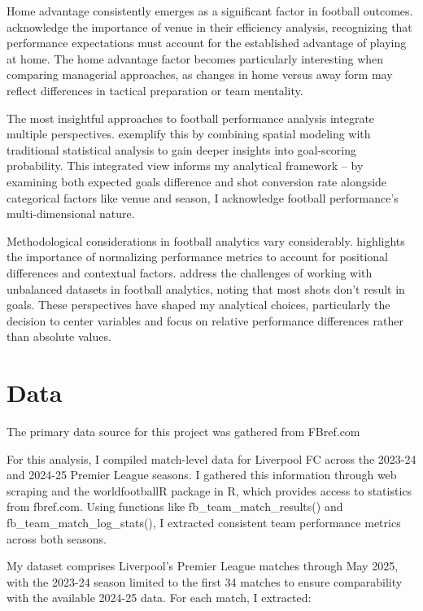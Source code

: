 \documentclass[12pt]{article}
\begin{document}
Home advantage consistently emerges as a significant factor in football outcomes. \citet{kern2012} acknowledge the importance of venue in their efficiency analysis, recognizing that performance expectations must account for the established advantage of playing at home. The home advantage factor becomes particularly interesting when comparing managerial approaches, as changes in home versus away form may reflect differences in tactical preparation or team mentality.

The most insightful approaches to football performance analysis integrate multiple perspectives. \citet{deb2019} exemplify this by combining spatial modeling with traditional statistical analysis to gain deeper insights into goal-scoring probability. This integrated view informs my analytical framework -- by examining both expected goals difference and shot conversion rate alongside categorical factors like venue and season, I acknowledge football performance's multi-dimensional nature.

Methodological considerations in football analytics vary considerably. \citet{isik2020} highlights the importance of normalizing performance metrics to account for positional differences and contextual factors. \citet{cavus2022} address the challenges of working with unbalanced datasets in football analytics, noting that most shots don't result in goals. These perspectives have shaped my analytical choices, particularly the decision to center variables and focus on relative performance differences rather than absolute values.

\section*{Data}

The primary data source for this project was gathered from FBref.com

For this analysis, I compiled match-level data for Liverpool FC across the 2023-24 and 2024-25 Premier League seasons. I gathered this information through web scraping and the worldfootballR package in R, which provides access to statistics from fbref.com. Using functions like fb\_team\_match\_results() and fb\_team\_match\_log\_stats(), I extracted consistent team performance metrics across both seasons.

My dataset comprises Liverpool's Premier League matches through May 2025, with the 2023-24 season limited to the first 34 matches to ensure comparability with the available 2024-25 data. For each match, I extracted:
\end{document}
